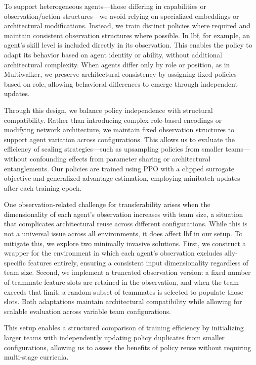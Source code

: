 \documentclass{article}
\begin{document}
To support heterogeneous agents—those differing in capabilities or observation/action 
structures—we avoid relying on specialized embeddings or architectural modifications. 
Instead, we train distinct policies where required and maintain consistent observation 
structures where possible. In \gls{lbf}, for example, an agent's skill level is included 
directly in its observation. This enables the policy to adapt its behavior based on 
agent identity or ability, without additional architectural complexity. 
When agents differ only by role or position, as in Multiwalker, 
we preserve architectural consistency by assigning fixed policies based on role, 
allowing behavioral differences to emerge through independent updates.

Through this design, we balance policy independence with structural compatibility. 
Rather than introducing complex role-based encodings or modifying network architecture, 
we maintain fixed observation structures to support agent variation across configurations. 
This allows us to evaluate the efficiency of scaling strategies—such as upsampling policies from 
smaller teams—without confounding effects from parameter sharing or architectural entanglements. 
Our policies are trained using PPO with a clipped surrogate objective and generalized 
advantage estimation, employing minibatch updates after each training epoch.

One observation-related challenge for transferability arises when the dimensionality 
of each agent's observation increases with team size, a situation that complicates 
architectural reuse across different configurations. While this is not a universal issue 
across all environments, it does affect \gls{lbf} in our setup. 
To mitigate this, we explore two minimally invasive solutions. First, we construct a wrapper 
for the environment in which each agent's observation excludes ally-specific features entirely, 
ensuring a consistent input dimensionality regardless of team size. Second, 
we implement a truncated observation version: a fixed number of teammate feature slots 
are retained in the observation, and when the team exceeds that limit, a random subset of 
teammates is selected to populate those slots. Both adaptations maintain architectural 
compatibility while allowing for scalable evaluation across variable team configurations.

This setup enables a structured comparison of training efficiency by initializing larger teams 
with independently updating policy duplicates from smaller configurations, allowing us to assess 
the benefits of policy reuse without requiring multi-stage curricula.
\end{document}

